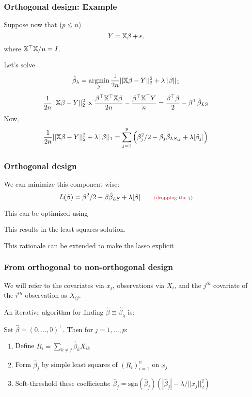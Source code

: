 \documentclass[12pt]{beamer}
\newcommand{\parenthetical}[2]{#1  \scriptstyle \alr{( #2)}}
\begin{document}
\begin{frame}
\frametitle{Orthogonal design: Example}
Suppose now that ($p \leq n$)
\[
Y = \mathbb{X}\beta + \epsilon,
\]
where $\mathbb{X}^{\top} \mathbb{X}/n = I$.   

\vsp
Let's solve 
\[
\hat\beta_{\lambda} = \operatorname*{\arg\!\min}_{\beta} \frac{1}{2n}|| \mathbb{X} \beta - Y||_2^2 + \lambda ||\beta||_1
\]
\[
\frac{1}{2n}|| \mathbb{X} \beta - Y||_2^2 
\propto 
\frac{\beta^{\top}\mathbb{X}^{\top}\mathbb{X}\beta}{2n} - \frac{\beta^{\top}\mathbb{X}^{\top}Y}{n} 
=
\frac{\beta^{\top}\beta}{2} - \beta^{\top}\hat\beta_{LS}
\]
Now,
\[
\frac{1}{2n}|| \mathbb{X} \beta - Y||_2^2 + \lambda ||\beta||_1 
= 
\sum_{j=1}^p \left( \beta_j^2/2 - \beta_j \hat{\beta}_{LS,j} +\lambda |\beta_j|\right)
\]
\end{frame}

\begin{frame}
\frametitle{Orthogonal design}
We can minimize this component wise: 
\[
L(\beta) =  \beta^2/2 - \beta \hat{\beta}_{LS} +\lambda |\beta| \parenthetical{\qquad}{\textrm{dropping the } j}
\]
\vsp

This can be optimized using  \smallCapGreen{[Exercise]}

This results in  the least squares solution.  

\vsp
This rationale can be extended to make the lasso  explicit
\end{frame}

\begin{frame}
\frametitle{From orthogonal to non-orthogonal design}
We will refer to the covariates via $x_j$, observations via $X_i$, and the $j^{th}$ covariate of the
$i^{th}$ observation as $X_{ij}$.

\vvsp
An iterative algorithm for finding $\hat\beta \equiv \hat\beta_{\lambda}$ is:

\vsp
Set $\hat \beta = (0,\ldots,0)^{\top}$.  Then for
$j = 1,\ldots,p$:
\begin{enumerate}
\item Define $R_i = \sum_{k \neq j} \hat \beta_{k} X_{ik}$
\item Form $\hat \beta_j$ by simple least squares of $(R_i)_{i=1}^n$ on $x_j$
\item Soft-threshold these coefficients: $\hat\beta_j = \textrm{sgn}(\hat{\beta}_j)(|\hat{\beta}_j| - \lambda/||x_j||_2^2)_{+}$
\end{enumerate}
\end{frame}
\end{document}
